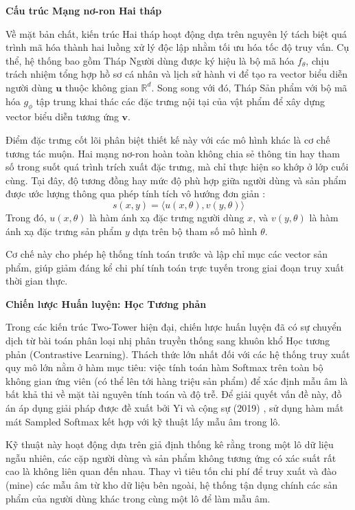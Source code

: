 \noindent \textbf{Cấu trúc Mạng nơ-ron Hai tháp}

Về mặt bản chất, kiến trúc Hai tháp hoạt động dựa trên nguyên lý tách biệt quá trình mã hóa thành hai luồng xử lý độc lập nhằm tối ưu hóa tốc độ truy vấn. Cụ thể, hệ thống bao gồm Tháp Người dùng được ký hiệu là bộ mã hóa $f_\theta$, chịu trách nhiệm tổng hợp hồ sơ cá nhân và lịch sử hành vi để tạo ra vector biểu diễn người dùng $\mathbf{u}$ thuộc không gian $\mathbb{R}^d$. Song song với đó, Tháp Sản phẩm với bộ mã hóa $g_\phi$ tập trung khai thác các đặc trưng nội tại của vật phẩm để xây dựng vector biểu diễn tương ứng $\mathbf{v}$.

Điểm đặc trưng cốt lõi phân biệt thiết kế này với các mô hình khác là cơ chế tương tác muộn. Hai mạng nơ-ron hoàn toàn không chia sẻ thông tin hay tham số trong suốt quá trình trích xuất đặc trưng, mà chỉ thực hiện so khớp ở lớp cuối cùng. Tại đây, độ tương đồng hay mức độ phù hợp giữa người dùng và sản phẩm được ước lượng thông qua phép tính tích vô hướng đơn giản \cite{7}:
\begin{equation}
    s(x,y) = \langle u(x, \theta), v(y, \theta) \rangle
\end{equation}
Trong đó, $u(x, \theta)$ là hàm ánh xạ đặc trưng người dùng $x$, và $v(y, \theta)$ là hàm ánh xạ đặc trưng sản phẩm $y$ dựa trên bộ tham số mô hình $\theta$.

Cơ chế này cho phép hệ thống tính toán trước và lập chỉ mục các vector sản phẩm, giúp giảm đáng kể chi phí tính toán trực tuyến trong giai đoạn truy xuất thời gian thực.

\vspace{0.3cm}

\noindent \textbf{Chiến lược Huấn luyện: Học Tương phản}

Trong các kiến trúc Two-Tower hiện đại, chiến lược huấn luyện đã có sự chuyển dịch từ bài toán phân loại nhị phân truyền thống sang khuôn khổ Học tương phản (Contrastive Learning). Thách thức lớn nhất đối với các hệ thống truy xuất quy mô lớn nằm ở hàm mục tiêu: việc tính toán hàm Softmax trên toàn bộ không gian ứng viên (có thể lên tới hàng triệu sản phẩm) để xác định mẫu âm là bất khả thi về mặt tài nguyên tính toán và độ trễ. Để giải quyết vấn đề này, đồ án áp dụng giải pháp được đề xuất bởi Yi và cộng sự (2019) \cite{8}, sử dụng hàm mất mát Sampled Softmax kết hợp với kỹ thuật lấy mẫu âm trong lô.

Kỹ thuật này hoạt động dựa trên giả định thống kê rằng trong một lô dữ liệu ngẫu nhiên, các cặp người dùng và sản phẩm không tương ứng có xác suất rất cao là không liên quan đến nhau. Thay vì tiêu tốn chi phí để truy xuất và đào (mine) các mẫu âm từ kho dữ liệu bên ngoài, hệ thống tận dụng chính các sản phẩm của người dùng khác trong cùng một lô để làm mẫu âm.


